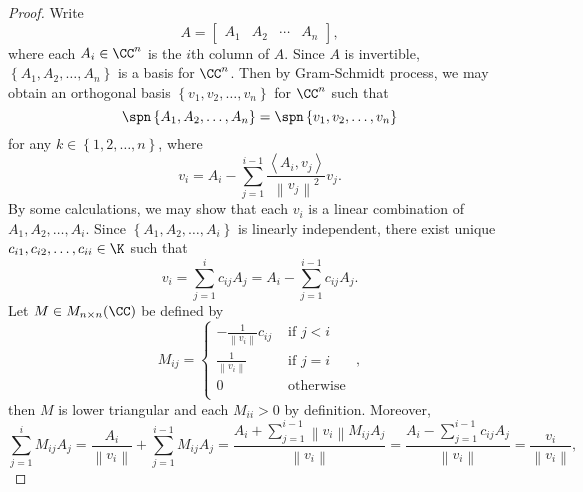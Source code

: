 \documentclass[linearalgebraII]{subfiles}
\begin{document}
    \begin{proof}
        Write
        \begin{equation*}
            A =
            \begin{bmatrix}
                A_1 & A_2 & \cdots & A_n
            \end{bmatrix},
        \end{equation*}
        where each $A_i\in\CC^n$ is the $i$th column of $A$. Since $A$ is invertible, $\left\lbrace A_1,A_2,\ldots,A_n \right\rbrace$ is a basis for $\CC^n$. Then by Gram-Schmidt process, we may obtain an orthogonal basis $\left\lbrace v_1,v_2,\ldots,v_n \right\rbrace$ for $\CC^n$ such that
        \begin{equation*}
            \spn\left\lbrace A_1,A_2,\ldots,A_n \right\rbrace = \spn\left\lbrace v_1,v_2,\ldots,v_n \right\rbrace
        \end{equation*}
        for any $k\in\left\lbrace 1,2,\ldots,n \right\rbrace$, where
        \begin{equation*}
            v_i = A_i - \sum^{i-1}_{j=1} \frac{\left\langle A_i, v_j\right\rangle }{\left\lVert v_j\right\rVert ^2}v_j.
        \end{equation*}
        By some calculations, we may show that each $v_i$ is a linear combination of $A_1,A_2,\ldots,A_i$. Since $\left\lbrace A_1,A_2,\ldots,A_i \right\rbrace$ is linearly independent, there exist unique $c_{i1}, c_{i2}, \ldots, c_{ii}\in\K$ such that
        \begin{equation*}
            v_i = \sum^{i}_{j=1} c_{ij}A_j = A_i - \sum^{i-1}_{j=1} c_{ij}A_j.
        \end{equation*}
        Let $M\in M_{n\times n}(\CC)$ be defined by
        \begin{equation*}
            M_{ij} = 
            \begin{cases} 
                - \frac{1}{\left\lVert v_i\right\rVert }c_{ij} & \text{ if } j<i \\
                \frac{1}{\left\lVert v_i\right\rVert } & \text{ if } j=i \\
                0 & \text{ otherwise } \\
            \end{cases},
        \end{equation*}
        then $M$ is lower triangular and each $M_{ii} > 0$ by definition. Moreover,
        \begin{equation*}
            \sum^{i}_{j=1} M_{ij}A_j = \frac{A_i}{\left\lVert v_i\right\rVert } + \sum^{i-1}_{j=1} M_{ij}A_j = \frac{A_i + \sum^{i-1}_{j=1} \left\lVert v_i\right\rVert M_{ij}A_j}{\left\lVert v_i\right\rVert } = \frac{A_i-\sum^{i-1}_{j=1} c_{ij}A_j}{\left\lVert v_i\right\rVert } = \frac{v_i}{\left\lVert v_i\right\rVert },

\end{equation*}
\end{proof}
\end{document}
